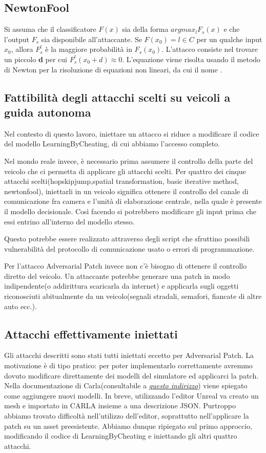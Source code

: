 \subsection{NewtonFool}

Si assuma che  il classificatore $F(x)$ sia della forma $arg max_l F_s(x)$ e che l'output $F_s$ sia disponibile all'attaccante. Se $F(x_0) = l \in C$ per un qualche  input $x_0$, allora $F^l_s$ è la maggiore probabilità
in $F_s(x_0)$. L'attacco consiste nel trovare un piccolo \textbf{d} per cui $F^l_s(x_0 + d) \approx 0$. L'equazione viene risolta usando il metodo di Newton
per la risoluzione di equazioni non lineari, da cui il nome \cite{newton}.

\subsection{Fattibilità degli attacchi scelti su veicoli a guida autonoma}
Nel contesto di questo lavoro, iniettare un attacco si riduce a modificare il codice del modello LearningByCheating, di cui abbiamo l'accesso completo. 

Nel  mondo reale invece, è necessario prima assumere il controllo della parte del  veicolo che ci permetta di applicare gli attacchi scelti.
Per quattro dei cinque attacchi scelti(hopskipjump,spatial transformation, basic iterative method, newtonfool), iniettarli in un veicolo significa ottenere il controllo del canale
di comunicazione fra camera e l'unità di elaborazione centrale, nella quale è presente il modello decisionale. Così facendo si potrebbero  modificare gli input prima che essi entrino
all'interno del modello stesso.

Questo potrebbe essere realizzato attraverso degli script che sfruttino possibili vulnerabilità del protocollo di comunicazione usato o errori di programmazione.

Per l'attacco Adversarial Patch invece non c'è bisogno  di ottenere il controllo diretto del veicolo. Un attaccante potrebbe generare
una patch in modo indipendente(o addirittura scaricarla da internet) e applicarla sugli oggetti riconosciuti abitualmente da un veicolo(segnali stradali, semafori, fiancate di altre auto ecc.).
\subsection{Attacchi effettivamente iniettati}
Gli attacchi  descritti sono stati tutti iniettati eccetto per Adversarial Patch. La motivazione è di tipo pratico: per poter implementarlo correttamente
avremmo dovuto modificare direttamente dei modelli del simulatore ed applicarci la patch. Nella documentazione di Carla(consultabile a \href{https://carla.readthedocs.io/en/latest/}{\emph{questo indirizzo}})
viene spiegato come aggiungere nuovi modelli. In breve, utilizzando l'editor Unreal va creato un mesh e importato in CARLA insieme 
a una descrizione JSON. Purtroppo abbiamo trovato difficoltà nell'utilizzo dell'editor, soprattutto nell'applicare la patch su un asset preesistente. Abbiamo dunque
ripiegato sul primo approccio, modificando il codice di LearningByCheating e iniettando gli altri quattro attacchi.
